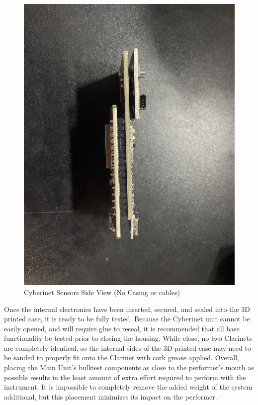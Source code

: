 \begin{center}
    \begin{figure}
        \centering
        \includegraphics[scale=0.05]{diagrams/PCBs/CyberinetThin.JPG}
        \caption{Cyberinet Sensors Side View (No Casing or cables)}
        \label{fig:Cyberinetside}
    \end{figure}
\end{center}

Once the internal electronics have been inserted, secured, and sealed into the 3D printed case, it is ready to be fully tested. Because the Cyberinet unit cannot be easily opened, and will require glue to reseal, it is recommended that all base functionality be tested prior to closing the housing. While close, no two Clarinets are completely identical, so the internal sides of the 3D printed case may need to be sanded to properly fit onto the Clarinet with cork grease applied. Overall, placing the Main Unit's bulkiest components as close to the performer's mouth as possible results in the least amount of extra effort required to perform with the instrument. It is impossible to completely remove the added weight of the system additional, but this placement minimizes its impact on the performer.


